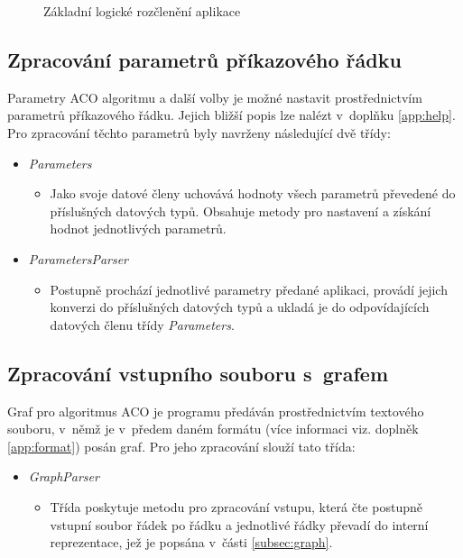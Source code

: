 \documentclass[a4paper, 12pt]{article}
\begin{document}
\begin{figure}[b]
  \begin{center}
    
  \end{center}
\caption{Základní logické rozčlenění aplikace}
\label{img:logika}
\end{figure}


\subsection{Zpracování parametrů příkazového řádku}
\label{subsec:process}
Parametry ACO algoritmu a další volby je možné nastavit prostřednictvím parametrů příkazového řádku. Jejich bližší popis lze nalézt v~doplňku \ref{app:help}.
Pro zpracování těchto parametrů byly navrženy následující dvě třídy:
\begin{itemize}
  \item \emph{Parameters}
  \begin{itemize}
    \item[] Jako svoje datové členy uchovává hodnoty všech parametrů převedené do příslušných datových typů.
    Obsahuje metody pro nastavení a získání hodnot jednotlivých parametrů.
  \end{itemize}
  \item \emph{ParametersParser}
  \begin{itemize}
    \item[] Postupně prochází jednotlivé parametry předané aplikaci, provádí jejich konverzi do příslušných datových typů a ukladá je do odpovídajících
    datových členu třídy \emph{Parameters}.
  \end{itemize}
\end{itemize}

\subsection{Zpracování vstupního souboru s~grafem}
Graf pro algoritmus ACO je programu předáván prostřednictvím textového souboru, v~němž je v~předem daném formátu (více informaci viz. doplněk \ref{app:format})
posán graf. Pro jeho zpracování slouží tato třída:
\begin{itemize}
  \item \emph{GraphParser}
  \begin{itemize}
    \item[] Třída poskytuje metodu pro zpracování vstupu, která čte postupně vstupní soubor řádek po řádku a jednotlivé řádky převadí do interní reprezentace,
    jež je popsána v~části \ref{subsec:graph}.
  \end{itemize}
\end{itemize}
\end{document}

